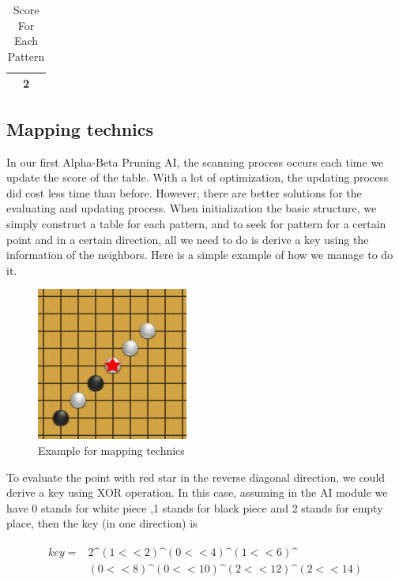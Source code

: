 \documentclass[a4paper, 12pt]{article} %
\begin{document}
\begin{multicols}{2}
\begin{table}[H]
\begin{center}
{\begin{tabularx}{8cm}{ccc}
\begin{minipage}[b]{ 0.3\columnwidth}
						\end{minipage} & 2 \\
						\bottomrule
					\end{tabularx}
				}
				\caption{Score For Each Pattern}
				\label{tab:table1}
			\end{center}
		\end{table}
	
	\subsection{Mapping technics}
	
		In our first Alpha-Beta Pruning AI, the scanning process occurs each time we update the score of the table. With a lot of optimization, the updating process did cost less time than before. However, there are better solutions for the evaluating and updating process. When initialization the basic structure, we simply construct a table for each pattern, and to seek for pattern for a certain point and in a certain direction, all we need to do is derive a key using the information of the neighbors. Here is a simple example of how we manage to do it.
		
		\begin{figure}[H]
			\centering
			\includegraphics[scale=1.0]{XORexample.png}
			\caption{Example for mapping technics}
		\end{figure}
	
		To evaluate the point with red star in the reverse diagonal direction, we could derive a key using XOR operation. In this case, assuming in the AI module we have 0 stands for white piece ,1 stands for black piece and 2 stands for empty place, then the key (in one direction) is
		
		\begin{eqnarray*}
			\begin{split}
				key = & 2 \^{} (1 << 2) \^{} (0 << 4) \^{} (1 << 6) \^{} \\
				& (0 << 8) \^{} (0 << 10) \^{} (2 << 12) \^{} (2 << 14) 
			\end{split}
		\end{eqnarray*}
	

\end{multicols}
\end{document}
